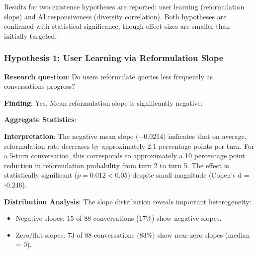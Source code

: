 
Results for two existence hypotheses are reported: user learning (reformulation slope) and AI responsiveness (diversity correlation). Both hypotheses are confirmed with statistical significance, though effect sizes are smaller than initially targeted.

\subsubsection{Hypothesis 1: User Learning via Reformulation Slope}

\textbf{Research question}: Do users reformulate queries less frequently as conversations progress?

\textbf{Finding}: Yes. Mean reformulation slope is significantly negative.

\textbf{Aggregate Statistics}:

\begin{table}[htbp]
\centering
{}
\end{table}

\textbf{Interpretation}: The negative mean slope ($-0.0214$) indicates that on average, reformulation rate decreases by approximately 2.1 percentage points per turn. For a 5-turn conversation, this corresponds to approximately a 10 percentage point reduction in reformulation probability from turn 2 to turn 5. The effect is statistically significant ($p = 0.012 < 0.05$) despite small magnitude (Cohen's d = -0.246).

\textbf{Distribution Analysis}: The slope distribution reveals important heterogeneity:
\begin{itemize}
\item Negative slopes: 15 of 88 conversations (17\%) show negative slopes.
\item Zero/flat slopes: 73 of 88 conversations (83\%) show near-zero slopes (median = 0).
\end{itemize}

